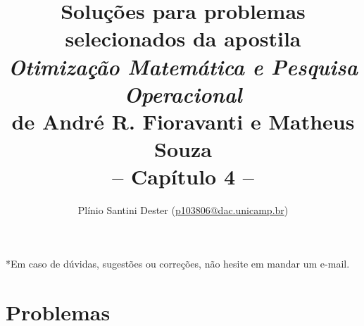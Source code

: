 


\title{	%
		{\Large Soluções para problemas selecionados da apostila\\[-0mm]
        \textit{Otimização Matemática e Pesquisa Operacional}\\[-2mm]
        de André R. Fioravanti e Matheus Souza}\\[2mm]
        -- Capítulo 4 --
}
\author{Plínio Santini Dester (\url{p103806@dac.unicamp.br})}



\maketitle

*Em caso de dúvidas, sugestões ou correções, não hesite em mandar um e-mail.

\setcounter{section}{3}
\section{Problemas}

\newpage

% 



